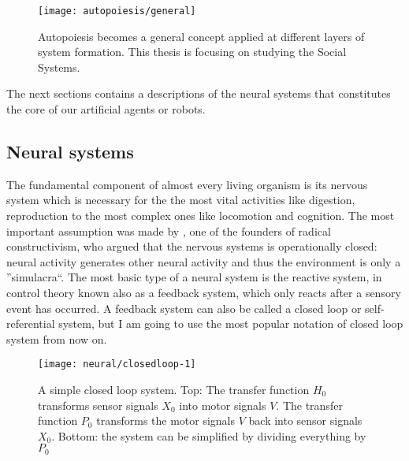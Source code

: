 \begin{figure}[htbp]
\begin{center}
\texttt{[image: autopoiesis/general]}
\end{center}
\small{
\caption[General definition of autopoiesis]{Autopoiesis becomes a general
concept applied at different layers of
system formation. This thesis is focusing on studying the Social Systems.
\label{Fig:Autopoiesis:General}}}
\end{figure}

The next sections contains a descriptions of the neural systems that constitutes
the core of our artificial agents or robots.


\subsection{Neural systems}
\label{Introduction:NeuralSystem}
The fundamental component of almost every living organism is its nervous system which
 is necessary for the the most vital activities like digestion, reproduction to the 
most complex ones like locomotion and cognition.
The most important assumption was made by \citet{VonFoerster85}, one of the founders of radical constructivism,
 who argued that the nervous systems is operationally closed: neural activity generates 
other neural activity and thus the environment is only a ''simulacra``.
The most basic type of a neural system is the reactive system, in control theory 
known also as a feedback system, which only reacts after a sensory event has occurred.
A feedback system can also be called a closed loop or self-referential system,
but I am going to use the most popular notation of closed loop system from now on.

\begin{figure}[htbp]
\begin{center}
\texttt{[image: neural/closedloop-1]}
\end{center}
\small{
\caption[Closed loop reactive system]{
A simple closed loop system. 
Top: The transfer function $H_0$ transforms sensor signals
$X_0$ into motor signals $V$. The transfer function $P_0$ transforms the motor signals $V$
back into sensor signals $X_0$.
Bottom: the system can be simplified by dividing everything by $P_0$
\label{Fig:Neural:ControlReactive}}}
\end{figure}

